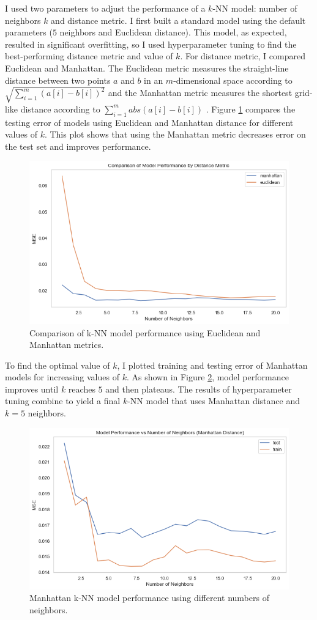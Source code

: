 \documentclass[pageno]{jpaper}
\begin{document}
I used two parameters to adjust the performance of a $k$-NN model: number of neighbors $k$ and distance metric. I first built a standard model using the default parameters ($5$ neighbors and Euclidean distance). This model, as expected, resulted in significant overfitting, so I used hyperparameter tuning to find the best-performing distance metric and value of $k$. For distance metric, I compared Euclidean and Manhattan. The Euclidean metric measures the straight-line distance between two points $a$ and $b$ in an $m$-dimensional space according to $\sqrt{\sum_{i=1}^{m}(a[i]-b[i])^2}$ and the Manhattan metric measures the shortest grid-like distance according to $\sum_{i=1}^{m}abs(a[i]-b[i])$ \cite{mitfundamentals}. Figure \ref{fig:distmetric} compares the testing error of models using Euclidean and Manhattan distance for different values of $k$. This plot shows that using the Manhattan metric decreases error on the test set and improves performance. 

\begin{figure}[hbt]
\centering
\includegraphics[width=0.75\linewidth]{distmetric.png}
\caption{Comparison of k-NN model performance using Euclidean and Manhattan metrics.}
\label{fig:distmetric}
\end{figure}

To find the optimal value of $k$, I plotted training and testing error of Manhattan models for increasing values of $k$. As shown in Figure \ref{fig:manhattan}, model performance improves until $k$ reaches $5$ and then plateaus. The results of hyperparameter tuning combine to yield a final $k$-NN model that uses Manhattan distance and $k=5$ neighbors.

\begin{figure}[hbt]
\centering
\includegraphics[width=0.75\linewidth]{manhattan.png}
\caption{Manhattan k-NN model performance using different numbers of neighbors.}
\label{fig:manhattan}
\end{figure}
\end{document}
